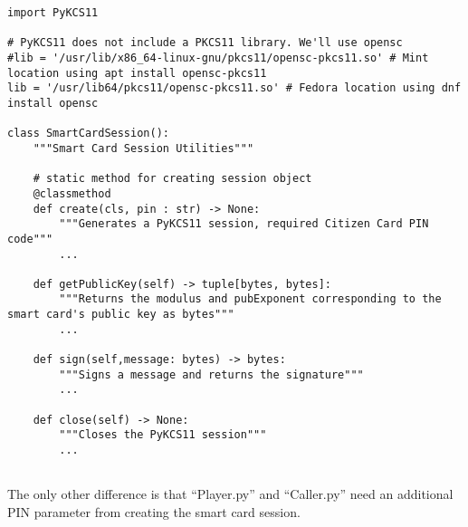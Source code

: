 \documentclass[11pt]{article}
\begin{document}
\begin{lstlisting}[captionpos=b label=listing:sparql_getallindividuals,
   basicstyle=\ttfamily]
import PyKCS11

# PyKCS11 does not include a PKCS11 library. We'll use opensc
#lib = '/usr/lib/x86_64-linux-gnu/pkcs11/opensc-pkcs11.so' # Mint location using apt install opensc-pkcs11
lib = '/usr/lib64/pkcs11/opensc-pkcs11.so' # Fedora location using dnf install opensc

class SmartCardSession():
    """Smart Card Session Utilities"""

    # static method for creating session object
    @classmethod
    def create(cls, pin : str) -> None:
        """Generates a PyKCS11 session, required Citizen Card PIN code"""
		...
		
    def getPublicKey(self) -> tuple[bytes, bytes]:
        """Returns the modulus and pubExponent corresponding to the smart card's public key as bytes"""
        ...

    def sign(self,message: bytes) -> bytes:
        """Signs a message and returns the signature"""
		...

    def close(self) -> None:
        """Closes the PyKCS11 session"""
        ...
        
\end{lstlisting}

The only other difference is that “Player.py” and “Caller.py” need an additional PIN parameter from creating the smart card session.
\end{document}
